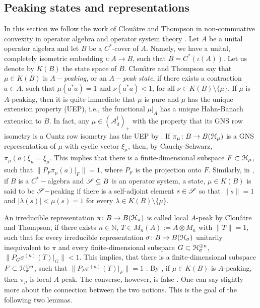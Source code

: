 \documentclass{article}
\theoremstyle{definition}
\theoremstyle{remark}
\numberwithin{equation}{section}
\newcommand{\scr}{\ensuremath{\mathscr}}
\newcommand{\sm}{\ensuremath{\setminus}}
\newcommand{\la}{\ensuremath{\lambda }}
\def\N{\mathbb{N}}
\def\posncm{(\mathscr{A} _d ^\dagger) _+}
\begin{document}
\subsection{Peaking states and representations} \label{subsec:peak}

In this section we follow the work of Clou\^{a}tre and Thompson in non-commuative convexity in operator algebra and operator system theory \cite{ClouThom-min_bound}. Let $A$ be a unital operator algebra and let $B$ be a $C^*$-cover of $A$. Namely, we have a unital, completely isometric embedding $\iota \colon A \to B$, such that $B = C^*(\iota(A))$. Let us denote by $K(B)$ the state space of $B$. Clou\^{a}tre and Thompson say that $\mu \in K(B)$ is \emph{$A-$peaking}, or an \emph{$A-$peak state}, if there exists a contraction $a \in A$, such that $\mu(a^* a) = 1$ and $\nu(a^* a) < 1$, for all $\nu \in K(B) \setminus \{\mu\}$. If $\mu$ is $A$-peaking, then it is quite immediate that $\mu$ is pure and $\mu$ has the unique extension property (UEP), i.e., the functional $\mu|_A$ has a unique Hahn-Banach extension to $B$. In fact, any $\mu \in \posncm$ with the property that its GNS row isometry is a Cuntz row isometry has the UEP by \cite[Proposition 5.11]{JMT-ncFnM}. If $\pi_{\mu} \colon B \to B({\mathcal H}_{\mu})$ is a GNS representation of $\mu$ with cyclic vector $\xi_{\mu}$, then, by Cauchy-Schwarz, $\pi_{\mu}(a) \xi_{\mu} = \xi_{\mu}$. This implies that there is a finite-dimensional subspace $F \subset {\mathcal H}_{\mu}$, such that $\|P_F \pi_{\mu}(a)|_F\| = 1$, where $P_F$ is the projection onto $F$. Similarly, in \cite{Clouatre-peaking}, if $B$ is a $C^*-$algebra and $\scr{S} \subseteq B$ is an operator system, a state, $\mu \in K (B)$ is said to be $\scr{S}-$peaking if there is a self-adjoint element $s \in \scr{S}$ so that $\| s \| = 1$ and $|\la (s)| < \mu (s) =1$ for every $\la \in K (B) \sm \{ \mu \}$.

An irreducible representation $\pi \colon B \to B({\mathcal H}_{\pi})$ is called local $A$-peak by Clou\^{a}tre and Thompson, if there exists $n \in \N$, $T \in M_n(A) := A \otimes M_n$ with $\|T\|=1$, such that for every irreducible representation $\sigma \colon B \to B({\mathcal H}_{\sigma})$ unitarily inequivalent to $\pi$ and every finite-dimensional subspace $G \subset {\mathcal H}_{\sigma}^{\oplus n}$, $\|P_G \sigma^{(n)}(T)|_G\| < 1$. This implies, that there is a finite-dimensional subspace $F \subset {\mathcal H}_{\pi}^{\oplus n}$, such that $\|P_F \pi^{(n)}(T)|_F \| = 1$ \cite[Lemma 2.2]{ClouThom-min_bound}. By \cite[Theorem 2.7]{ClouThom-min_bound}, if $\mu \in K(B)$ is $A$-peaking, then $\pi_{\mu}$ is local $A$-peak. The converse, however, is false \cite[Example 2]{ClouThom-min_bound}. One can say slightly more about the connection between the two notions. This is the goal of the following two lemmas.
\end{document}
